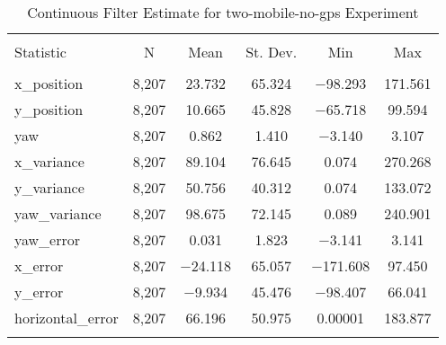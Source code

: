 
\begin{table}[h] \centering 
  \caption{Continuous Filter Estimate for two-mobile-no-gps Experiment} 
  \label{tab:two_mobile_no_gps_continuous_summary} 
\begin{tabular}{@{\extracolsep{5pt}}lccccc} 
\\[-1.8ex]\hline 
\hline \\[-1.8ex] 
Statistic & \multicolumn{1}{c}{N} & \multicolumn{1}{c}{Mean} & \multicolumn{1}{c}{St. Dev.} & \multicolumn{1}{c}{Min} & \multicolumn{1}{c}{Max} \\ 
\hline \\[-1.8ex] 
x\_position & 8,207 & 23.732 & 65.324 & $-$98.293 & 171.561 \\ 
y\_position & 8,207 & 10.665 & 45.828 & $-$65.718 & 99.594 \\ 
yaw & 8,207 & 0.862 & 1.410 & $-$3.140 & 3.107 \\ 
x\_variance & 8,207 & 89.104 & 76.645 & 0.074 & 270.268 \\ 
y\_variance & 8,207 & 50.756 & 40.312 & 0.074 & 133.072 \\ 
yaw\_variance & 8,207 & 98.675 & 72.145 & 0.089 & 240.901 \\ 
yaw\_error & 8,207 & 0.031 & 1.823 & $-$3.141 & 3.141 \\ 
x\_error & 8,207 & $-$24.118 & 65.057 & $-$171.608 & 97.450 \\ 
y\_error & 8,207 & $-$9.934 & 45.476 & $-$98.407 & 66.041 \\ 
horizontal\_error & 8,207 & 66.196 & 50.975 & 0.00001 & 183.877 \\ 
\hline \\[-1.8ex] 
\end{tabular} 
\end{table} 
